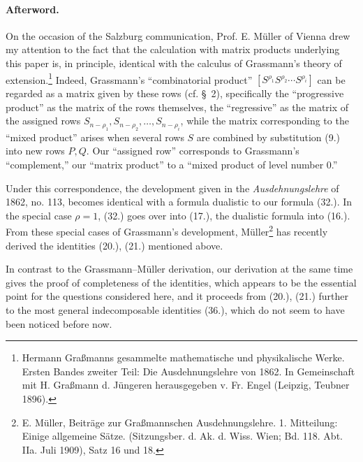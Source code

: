 \documentclass[11pt]{article}
\begin{document}
\paragraph{Afterword.} On the occasion of the Salzburg communication, Prof. E. Müller of Vienna drew my attention to the fact that the calculation with matrix products underlying this paper is, in principle, identical with the calculus of Grassmann's theory of extension.\footnote{Hermann Graßmanns gesammelte mathematische und physikalische Werke. Ersten Bandes zweiter Teil: Die Ausdehnungslehre von 1862. In Gemeinschaft mit H. Graßmann d. Jüngeren herausgegeben v. Fr. Engel (Leipzig, Teubner 1896).} Indeed, Grassmann's ``combinatorial product'' $[S^{\rho_1}S^{\rho_2}\cdots S^{\rho_i}]$ can be regarded as a matrix given by these rows (cf. \S\ 2), specifically the ``progressive product'' as the matrix of the rows themselves, the ``regressive'' as the matrix of the assigned rows $S_{n-\rho_1},S_{n-\rho_2},\ldots,S_{n-\rho_i}$, while the matrix corresponding to the ``mixed product'' arises when several rows $S$ are combined by substitution (9.) into new rows $P,Q$. Our ``assigned row'' corresponds to Grassmann's ``complement,'' our ``matrix product'' to a ``mixed product of level number 0.''

Under this correspondence, the development given in the \emph{Ausdehnungslehre} of 1862, no. 113, becomes identical with a formula dualistic to our formula (32.). In the special case $\rho=1$, (32.) goes over into (17.), the dualistic formula into (16.). From these special cases of Grassmann's development, Müller\footnote{E. Müller, Beiträge zur Graßmannschen Ausdehnungslehre. 1. Mitteilung: Einige allgemeine Sätze. (Sitzungsber. d. Ak. d. Wiss. Wien; Bd. 118. Abt. IIa. Juli 1909), Satz 16 und 18.} has recently derived the identities (20.), (21.) mentioned above.

In contrast to the Grassmann--Müller derivation, our derivation at the same time gives the proof of completeness of the identities, which appears to be the essential point for the questions considered here, and it proceeds from (20.), (21.) further to the most general indecomposable identities (36.), which do not seem to have been noticed before now.
\end{document}

